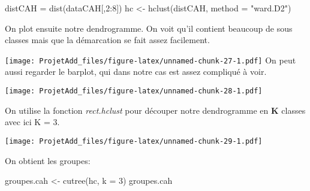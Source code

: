 \documentclass[
]{article}
\newenvironment{Shaded}{\begin{snugshade}}{\end{snugshade}}
\newcommand{\AttributeTok}[1]{\textcolor[rgb]{0.77,0.63,0.00}{#1}}
\newcommand{\DecValTok}[1]{\textcolor[rgb]{0.00,0.00,0.81}{#1}}
\newcommand{\FunctionTok}[1]{\textcolor[rgb]{0.00,0.00,0.00}{#1}}
\newcommand{\NormalTok}[1]{#1}
\newcommand{\OtherTok}[1]{\textcolor[rgb]{0.56,0.35,0.01}{#1}}
\newcommand{\SpecialCharTok}[1]{\textcolor[rgb]{0.00,0.00,0.00}{#1}}
\newcommand{\StringTok}[1]{\textcolor[rgb]{0.31,0.60,0.02}{#1}}
\begin{document}
\begin{Shaded}
\begin{Highlighting}[]
\NormalTok{distCAH }\OtherTok{=} \FunctionTok{dist}\NormalTok{(dataCAH[,}\DecValTok{2}\SpecialCharTok{:}\DecValTok{8}\NormalTok{])}
\NormalTok{hc }\OtherTok{\textless{}{-}} \FunctionTok{hclust}\NormalTok{(distCAH, }\AttributeTok{method =} \StringTok{"ward.D2"}\NormalTok{)}
\end{Highlighting}
\end{Shaded}

On plot ensuite notre dendrogramme. On voit qu'il contient beaucoup de
sous classes mais que la démarcation se fait assez facilement.

\begin{Shaded}
\end{Shaded}

\texttt{[image: ProjetAdd\_files/figure-latex/unnamed-chunk-27-1.pdf]} On
peut aussi regarder le barplot, qui dans notre cas est assez compliqué à
voir.

\begin{Shaded}
\end{Shaded}

\texttt{[image: ProjetAdd\_files/figure-latex/unnamed-chunk-28-1.pdf]}

On utilise la fonction \emph{rect.hclust} pour découper notre
dendrogramme en \textbf{K} classes avec ici K = 3.

\begin{Shaded}
\end{Shaded}

\texttt{[image: ProjetAdd\_files/figure-latex/unnamed-chunk-29-1.pdf]}

On obtient les groupes:

\begin{Shaded}
\begin{Highlighting}[]
\NormalTok{groupes.cah }\OtherTok{\textless{}{-}} \FunctionTok{cutree}\NormalTok{(hc, }\AttributeTok{k =} \DecValTok{3}\NormalTok{)}
\NormalTok{groupes.cah}
\end{Highlighting}
\end{Shaded}
\end{document}
